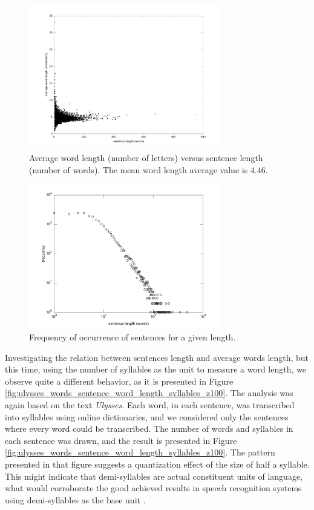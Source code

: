 \begin{figure}[h!]
\centering
\includegraphics[width=0.75\textwidth]{images/ulysses_words_sentence_word_length.png}
\caption{Average word length (number of letters) versus sentence length (number of words).
The mean word length average value is $4.46$.}
\label{fig:ulysses_words_sentence_word_length}
\end{figure} 


\begin{figure}[h!]
\centering
\includegraphics[width=0.75\textwidth]{images/ulysses_words_sentence_word_length_freq.pdf}
\caption{Frequency of occurrence of sentences for a given length.}
\label{fig:ulysses_words_sentence_word_length_freq}
\end{figure} 


Investigating the relation between sentences length and average words length, 
but this time, using the number of syllables as the unit to measure a word length,
we observe quite a different behavior, as it is presented in Figure \ref{fig:ulysses_words_sentence_word_length_syllables_z100}.
The analysis was again based on the text \textit{Ulysses}. Each word, in each sentence,
was transcribed into syllables using online dictionaries, and we considered only the sentences
where every word could be transcribed. The number of words and syllables in each sentence
was drawn, and the result is presented in Figure \ref{fig:ulysses_words_sentence_word_length_syllables_z100}.
The pattern presented in that figure suggests a quantization effect of the size of half a syllable.
This might indicate that demi-syllables are actual constituent units of language, what would
corroborate the good achieved results in speech recognition systems using demi-syllables as 
the base unit \citep{yoshida1989}.

